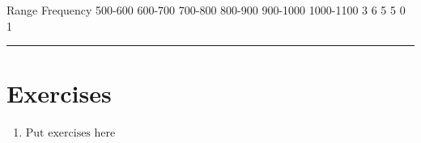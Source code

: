 \documentclass[
]{book}
\providecommand{\tightlist}{%
  \setlength{\itemsep}{0pt}\setlength{\parskip}{0pt}}
\begin{document}
Range Frequency
500-600
600-700
700-800
800-900
900-1000
1000-1100 3
6
5
5
0
1

\begin{center}\rule{0.5\linewidth}{0.5pt}\end{center}

\hypertarget{exercises-7}{%
\section{Exercises}\label{exercises-7}}

\begin{enumerate}
\def\labelenumi{\arabic{enumi}.}
\tightlist
\item
  \(\text{Put exercises here}\)
\end{enumerate}

  
\end{document}
